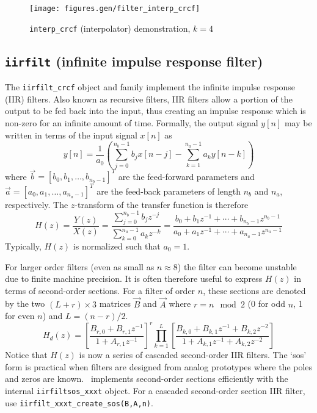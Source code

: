 

\begin{figure}
\centering
  \texttt{[image: figures.gen/filter\_interp\_crcf]}
\caption{{\tt interp\_crcf} (interpolator) demonstration, $k=4$}
\label{fig:module:filter:interp_crcf}
\end{figure}


\subsection{{\tt iirfilt} (infinite impulse response filter)}
\label{module:filter:iirfilt}
The {\tt iirfilt\_crcf} object and family implement the infinite impulse
response (IIR) filters.
Also known as recursive filters, IIR filters allow a portion of the output to
be fed back into the input, thus creating an impulse response which is
non-zero for an infinite amount of time.
Formally, the output signal $y[n]$ may be written in terms of the input signal
$x[n]$ as
\[
    y[n] = \frac{1}{a_0} \left(
           \sum_{j=0}^{n_b-1}{ b_j x[n-j] } -
           \sum_{k=1}^{n_a-1}{ a_k y[n-k] }
           \right)
\]
where $\vec{b} = [b_0,b_1,\ldots,b_{n_b-1}]^T$ are the feed-forward parameters
and   $\vec{a} = [a_0,a_1,\ldots,a_{n_a-1}]^T$ are the feed-back parameters
of length $n_b$ and $n_a$, respectively.
The $z$-transform of the transfer function is therefore
\[
    H(z) = \frac{Y(z)}{X(z)}
         = \frac{\sum\limits_{j=0}^{n_b-1}{b_j z^{-j}}}
                {\sum\limits_{k=0}^{n_a-1}{a_k z^{-k}}}
         = \frac{ b_0 + b_1 z^{-1} + \cdots + b_{n_b-1} z^{n_b-1}}
                { a_0 + a_1 z^{-1} + \cdots + a_{n_a-1} z^{n_a-1}}
\]
Typically, $H(z)$ is normalized such that $a_0=1$.

For larger order filters (even as small as $n\approx 8$) the filter can become
unstable due to finite machine precision.
It is often therefore useful to express $H(z)$ in terms of second-order
sections.
For a filter of order $n$, these sections are denoted by the two
$(L+r)\times 3$ matrices $\vec{B}$ and $\vec{A}$
where $r=n \mod 2$ (0 for odd $n$, 1 for even $n$) and $L=(n-r)/2$.
\[
    H_d(z) = 
             \left[
                \frac{B_{r,0} + B_{r,1}z^{-1}}
                     {1       + A_{r,1}z^{-1}}
             \right]^r
             \prod_{k=1}^{L} {\left[
                \frac{B_{k,0} + B_{k,1}z^{-1} + B_{k,2}z^{-2}}
                     {1       + A_{k,1}z^{-1} + A_{k,2}z^{-2}}
             \right]}
\]
Notice that $H(z)$ is now a series of cascaded second-order IIR filters.
The `sos' form is practical when filters are designed from analog prototypes
where the poles and zeros are known.
\liquid\ implements second-order sections efficiently with the internal
{\tt iirfiltsos\_xxxt} object.
For a cascaded second-order section IIR filter, use
{\tt iirfilt\_xxxt\_create\_sos(B,A,n)}.

